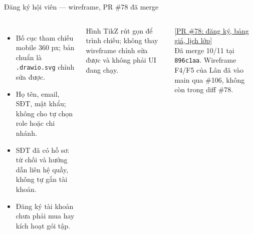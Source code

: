 \documentclass[aspectratio=169,10pt]{beamer}
\begin{document}
\begin{frame}{Đăng ký hội viên — wireframe, PR \#78 đã merge}
  \begin{columns}[T,onlytextwidth]
      \centering
      \begin{itemize}
        \item Bố cục tham chiếu mobile 360 px; bản chuẩn là \texttt{.drawio.svg} chỉnh sửa được.
        \item Họ tên, email, SĐT, mật khẩu; không cho tự chọn role hoặc chi nhánh.
        \item SĐT đã có hồ sơ: từ chối và hướng dẫn liên hệ quầy, không tự gắn tài khoản.
        \item Đăng ký tài khoản chưa phải mua hay kích hoạt gói tập.
      \end{itemize}
      \vspace{1em}
      \small Hình TikZ rút gọn để trình chiếu; không thay wireframe chỉnh sửa được và không phải UI đang chạy.
      \vspace{1em}

      \scriptsize [\href{https://github.com/Ktin06/it3180_nhom6_gym_management/pull/78}{PR \#78: đăng ký, bảng giá, lịch lớp}]\\
      Đã merge 10/11 tại \texttt{896c1aa}. Wireframe F4/F5 của Lân đã vào main qua \#106, không còn trong diff \#78.
  \end{columns}
\end{frame}
\end{document}
